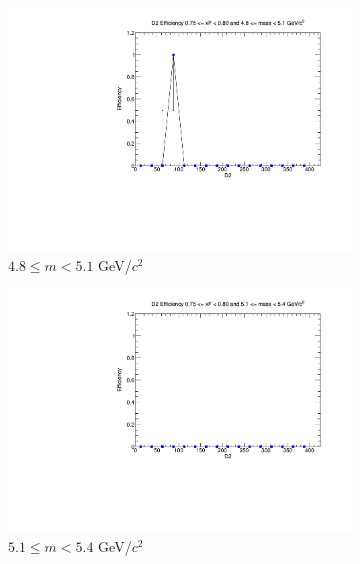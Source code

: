 \documentclass[11pt]{article}
\begin{document}
\begin{figure}[p]
\begin{subfigure}[b]{0.32\textwidth}
        \includegraphics[width=\textwidth]{./kTrackerEfficiencyPlots/D2_Efficiency_xF15_mass2.pdf}
        \caption{$4.8 \leq m < 5.1$ GeV/$c^2$}
    \end{subfigure}\vspace{0.5cm}
    \begin{subfigure}[b]{0.32\textwidth}
        \centering
        \includegraphics[width=\textwidth]{./kTrackerEfficiencyPlots/D2_Efficiency_xF15_mass3.pdf}
        \caption{$5.1 \leq m < 5.4$ GeV/$c^2$}
    \end{subfigure}\hfill
    \begin{subfigure}[b]{0.32\textwidth}
        \centering

\end{subfigure}
\end{figure}
\end{document}
